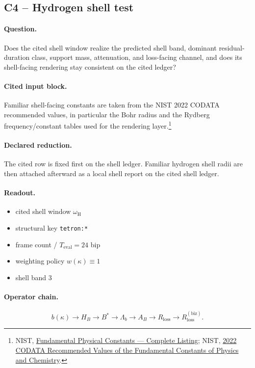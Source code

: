 \subsection{C4 -- Hydrogen shell test}\label{suppc:c4-hydrogen-shell}
\paragraph{Question.} Does the cited shell window realize the predicted shell band, dominant residual-duration class, support mass, attenuation, and loss-facing channel, and does its shell-facing rendering stay consistent on the cited ledger?

\paragraph{Cited input block.} Familiar shell-facing constants are taken from the NIST 2022 CODATA recommended values, in particular the Bohr radius and the Rydberg frequency/constant tables used for the rendering layer.\footnote{NIST, \href{https://physics.nist.gov/cuu/Constants/Table/allascii.txt}{Fundamental Physical Constants --- Complete Listing}; NIST, \href{https://physics.nist.gov/cuu/pdf/wallet_2022.pdf}{2022 CODATA Recommended Values of the Fundamental Constants of Physics and Chemistry}.}

\paragraph{Declared reduction.} The cited row is fixed first on the shell ledger. Familiar hydrogen shell radii are then attached afterward as a local shell report on the cited shell ledger.

\paragraph{Readout.}
\begin{itemize}
\item cited shell window $\omega_{\mathrm{H}}$
\item structural key \texttt{tetron:*}
\item frame count / $T_{\mathrm{eval}}=24$ bip
\item weighting policy $w(\kappa)\equiv 1$
\item shell band $3$
\end{itemize}

\paragraph{Operator chain.}
\[
b(\kappa)\to H_B\to B^*\to \Lambda_b\to A_B\to R_{\mathrm{loss}}\to R_{\mathrm{loss}}^{(\mathrm{biz})}.
\]

